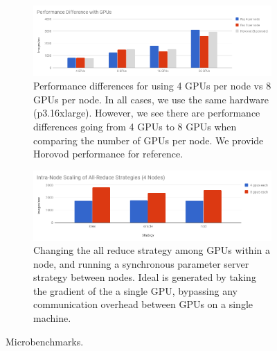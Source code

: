 

\begin{figure}
\begin{subfigure}{0.45\textwidth}
\includegraphics[width=1\textwidth]{fig/4to8.png}
    \caption{
    \small{
        Performance differences for using 4 GPUs per node vs 8 GPUs per node. In all cases, we use the same hardware (p3.16xlarge). However, we see there are performance differences going from 4 GPUs to 8 GPUs when comparing the number of GPUs per node. We provide Horovod performance for reference.
    }
    }
    \label{fig:8-vs-4-gpu}
\end{subfigure}\hspace{\fill}
\begin{subfigure}{0.45\textwidth}
\includegraphics[width=1\textwidth]{fig/intranode.png}
    \caption{ \small{ Changing the all reduce strategy among GPUs within a node,
        and running a synchronous parameter server strategy between nodes. Ideal
        is generated by taking the gradient of the a single GPU, bypassing any
        communication overhead between GPUs on a single machine.  } }

    \label{fig:intra-node-allreduce-strategy}
\end{subfigure}
\caption{Microbenchmarks.}

\end{figure}
